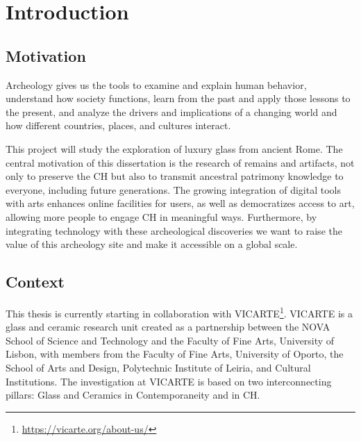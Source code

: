 
%

\chapter{Introduction}
\label{cha:introduction}

\section{Motivation}
\label{sec:motivation}
Archeology gives us the tools to examine and explain human behavior, understand how 
society functions, learn from the past and apply those lessons to the present, and analyze
 the drivers and implications of a changing world and how different countries, places, and cultures interact.~\cite{oxfordarchaeology2025}

This project will study the exploration of luxury glass from ancient Rome.
The central motivation of this dissertation is the research of remains and artifacts, not
only to preserve the \gls{CH} but also to transmit ancestral patrimony knowledge to everyone, including future generations. 
The growing integration of digital tools with arts enhances online 
facilities for users, as well as democratizes access to art, allowing more people to engage 
\gls{CH} in meaningful ways. Furthermore, by integrating technology with these archeological 
discoveries we want to raise the value of this archeology site and make it accessible on a global scale.



\section{Context}
\label{sec:context}
This thesis is currently starting in collaboration with \gls{VICARTE}\footnote{\url{https://vicarte.org/about-us/}}. \gls{VICARTE} is a glass and 
ceramic research unit created as a partnership between the NOVA School of Science and Technology and the Faculty of Fine Arts, University of Lisbon, with members from the Faculty of Fine Arts, University of Oporto, the School of Arts and Design, Polytechnic Institute of Leiria, and Cultural Institutions.
The investigation at \gls{VICARTE} is based on two interconnecting pillars: Glass and Ceramics in Contemporaneity and in \gls{CH}. 

